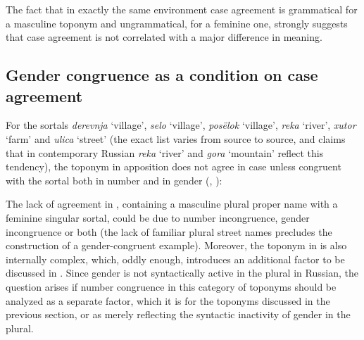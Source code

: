 \documentclass[output=paper,colorlinks,citecolor=brown]{langscibook}
\begin{document}
\noindent The fact that in exactly the same environment case agreement is grammatical for a masculine toponym and ungrammatical, for a feminine one, strongly suggests that case agreement is not correlated with a major difference in meaning.

\subsection{Gender congruence as a condition on case agreement}\label{mat:sec:gender-congruence-condition}

For the sortals \textit{derevnja} ‘village’, \textit{selo} ‘village’, \textit{posëlok} ‘village’, \textit{reka} ‘river’, \textit{xutor} ‘farm’ and \textit{ulica} ‘street’ (the exact list varies from source to source, and \citealt{Logvinova2018} claims that in contemporary Russian \textit{reka} ‘river’ and \textit{gora} ‘mountain’ reflect this tendency), the toponym in apposition does not agree in case unless congruent with the sortal both in number and in gender (\citealt[281]{RozentalKabanova1998}, \citealt[140]{GraudinaKatlinskaja1976}):

\ea\label{mat:ex:Jakimanka-Balcug-CistyePrudy}
\z
\z

\noindent The lack of agreement in , containing a masculine plural proper name with a feminine singular sortal, could be due to number incongruence, gender incongruence or both (the lack of familiar plural street names precludes the construction of a gender-congruent example). Moreover, the toponym in  is also internally complex, which, oddly enough, introduces an additional factor to be discussed in . Since gender is not syntactically active in the plural in Russian, the question arises if number congruence in this category of toponyms should be analyzed as a separate factor, which it is for the toponyms discussed in the previous section, or as merely reflecting the syntactic inactivity of gender in the plural.
\end{document}
